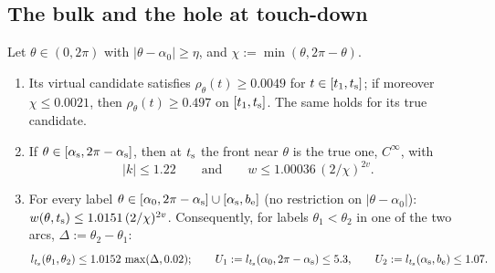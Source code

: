 \subsection{The bulk and the hole at touch-down}\label{sec:T1-bulk}

\begin{lemma}[Bulk]\label{lem:T1-bulk}
Let $\theta\in(0,2\pi)$ with $|\theta-\alpha_0|\ge\eta$, and $\chi:=\min(\theta,2\pi-\theta)$.
\begin{enumerate}
\item[(a)] Its virtual candidate satisfies $\rho_\theta(t)\ge0.0049$ for $t\in[t_1,t_{\mathrm s}]$; if moreover $\chi\le0.0021$, then
$\rho_\theta(t)\ge0.497$ on $[t_1,t_{\mathrm s}]$. The same holds for its true candidate.
\item[(b)] If $\theta\in[\alpha_{\mathrm s},2\pi-\alpha_{\mathrm s}]$, then at $t_{\mathrm s}$ the front near $\theta$ is the true one, $C^\infty$, with
\[
|k|\le1.22\qquad\text{and}\qquad w\le1.00036\,(2/\chi)^{2v}.
\]
\item[(c)] For every label $\theta\in[\alpha_0,2\pi-\alpha_{\mathrm s}]\cup[\alpha_{\mathrm s},b_{\mathrm e}]$ (no restriction on $|\theta-\alpha_0|$):
$w(\theta,t_{\mathrm s})\le1.0151\,(2/\chi)^{2v}$. Consequently, for labels $\theta_1<\theta_2$ in one of the two arcs,
$\Delta:=\theta_2-\theta_1$:
\[
l_{t_{\mathrm s}}(\theta_1,\theta_2)\le1.0152\,\max(\Delta,0.02);\qquad
U_1:=l_{t_{\mathrm s}}(\alpha_0,2\pi-\alpha_{\mathrm s})\le5.3,\qquad U_2:=l_{t_{\mathrm s}}(\alpha_{\mathrm s},b_{\mathrm e})\le1.07 .
\]
\end{enumerate}
\end{lemma}
